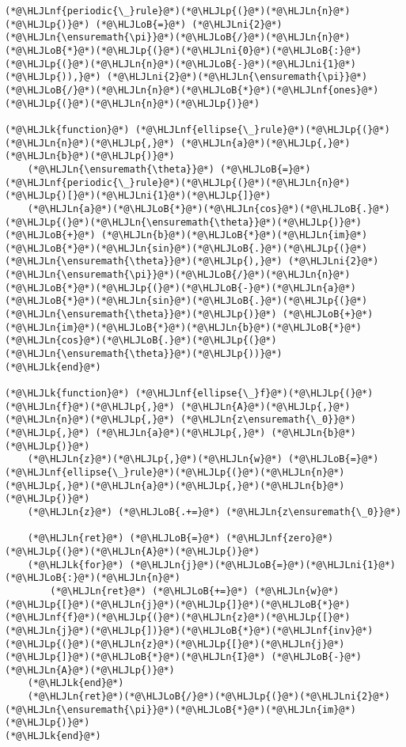 \documentclass[12pt,a4paper]{article}
\newcommand{\HLJLk}[1]{\textcolor[RGB]{148,91,176}{\textbf{#1}}}
\newcommand{\HLJLn}[1]{#1}
\newcommand{\HLJLnf}[1]{\textcolor[RGB]{66,102,213}{#1}}
\newcommand{\HLJLni}[1]{\textcolor[RGB]{59,151,46}{#1}}
\newcommand{\HLJLoB}[1]{\textcolor[RGB]{102,102,102}{\textbf{#1}}}
\newcommand{\HLJLp}[1]{#1}
\begin{document}
\begin{lstlisting}
(*@\HLJLnf{periodic{\_}rule}@*)(*@\HLJLp{(}@*)(*@\HLJLn{n}@*)(*@\HLJLp{)}@*) (*@\HLJLoB{=}@*) (*@\HLJLni{2}@*)(*@\HLJLn{\ensuremath{\pi}}@*)(*@\HLJLoB{/}@*)(*@\HLJLn{n}@*)(*@\HLJLoB{*}@*)(*@\HLJLp{(}@*)(*@\HLJLni{0}@*)(*@\HLJLoB{:}@*)(*@\HLJLp{(}@*)(*@\HLJLn{n}@*)(*@\HLJLoB{-}@*)(*@\HLJLni{1}@*)(*@\HLJLp{)),}@*) (*@\HLJLni{2}@*)(*@\HLJLn{\ensuremath{\pi}}@*)(*@\HLJLoB{/}@*)(*@\HLJLn{n}@*)(*@\HLJLoB{*}@*)(*@\HLJLnf{ones}@*)(*@\HLJLp{(}@*)(*@\HLJLn{n}@*)(*@\HLJLp{)}@*)

(*@\HLJLk{function}@*) (*@\HLJLnf{ellipse{\_}rule}@*)(*@\HLJLp{(}@*)(*@\HLJLn{n}@*)(*@\HLJLp{,}@*) (*@\HLJLn{a}@*)(*@\HLJLp{,}@*) (*@\HLJLn{b}@*)(*@\HLJLp{)}@*)
    (*@\HLJLn{\ensuremath{\theta}}@*) (*@\HLJLoB{=}@*) (*@\HLJLnf{periodic{\_}rule}@*)(*@\HLJLp{(}@*)(*@\HLJLn{n}@*)(*@\HLJLp{)[}@*)(*@\HLJLni{1}@*)(*@\HLJLp{]}@*)
    (*@\HLJLn{a}@*)(*@\HLJLoB{*}@*)(*@\HLJLn{cos}@*)(*@\HLJLoB{.}@*)(*@\HLJLp{(}@*)(*@\HLJLn{\ensuremath{\theta}}@*)(*@\HLJLp{)}@*) (*@\HLJLoB{+}@*) (*@\HLJLn{b}@*)(*@\HLJLoB{*}@*)(*@\HLJLn{im}@*)(*@\HLJLoB{*}@*)(*@\HLJLn{sin}@*)(*@\HLJLoB{.}@*)(*@\HLJLp{(}@*)(*@\HLJLn{\ensuremath{\theta}}@*)(*@\HLJLp{),}@*) (*@\HLJLni{2}@*)(*@\HLJLn{\ensuremath{\pi}}@*)(*@\HLJLoB{/}@*)(*@\HLJLn{n}@*)(*@\HLJLoB{*}@*)(*@\HLJLp{(}@*)(*@\HLJLoB{-}@*)(*@\HLJLn{a}@*)(*@\HLJLoB{*}@*)(*@\HLJLn{sin}@*)(*@\HLJLoB{.}@*)(*@\HLJLp{(}@*)(*@\HLJLn{\ensuremath{\theta}}@*)(*@\HLJLp{)}@*) (*@\HLJLoB{+}@*) (*@\HLJLn{im}@*)(*@\HLJLoB{*}@*)(*@\HLJLn{b}@*)(*@\HLJLoB{*}@*)(*@\HLJLn{cos}@*)(*@\HLJLoB{.}@*)(*@\HLJLp{(}@*)(*@\HLJLn{\ensuremath{\theta}}@*)(*@\HLJLp{))}@*)
(*@\HLJLk{end}@*)

(*@\HLJLk{function}@*) (*@\HLJLnf{ellipse{\_}f}@*)(*@\HLJLp{(}@*)(*@\HLJLn{f}@*)(*@\HLJLp{,}@*) (*@\HLJLn{A}@*)(*@\HLJLp{,}@*) (*@\HLJLn{n}@*)(*@\HLJLp{,}@*) (*@\HLJLn{z\ensuremath{\_0}}@*)(*@\HLJLp{,}@*) (*@\HLJLn{a}@*)(*@\HLJLp{,}@*) (*@\HLJLn{b}@*)(*@\HLJLp{)}@*)
    (*@\HLJLn{z}@*)(*@\HLJLp{,}@*)(*@\HLJLn{w}@*) (*@\HLJLoB{=}@*) (*@\HLJLnf{ellipse{\_}rule}@*)(*@\HLJLp{(}@*)(*@\HLJLn{n}@*)(*@\HLJLp{,}@*)(*@\HLJLn{a}@*)(*@\HLJLp{,}@*)(*@\HLJLn{b}@*)(*@\HLJLp{)}@*)
    (*@\HLJLn{z}@*) (*@\HLJLoB{.+=}@*) (*@\HLJLn{z\ensuremath{\_0}}@*)

    (*@\HLJLn{ret}@*) (*@\HLJLoB{=}@*) (*@\HLJLnf{zero}@*)(*@\HLJLp{(}@*)(*@\HLJLn{A}@*)(*@\HLJLp{)}@*)
    (*@\HLJLk{for}@*) (*@\HLJLn{j}@*)(*@\HLJLoB{=}@*)(*@\HLJLni{1}@*)(*@\HLJLoB{:}@*)(*@\HLJLn{n}@*)
        (*@\HLJLn{ret}@*) (*@\HLJLoB{+=}@*) (*@\HLJLn{w}@*)(*@\HLJLp{[}@*)(*@\HLJLn{j}@*)(*@\HLJLp{]}@*)(*@\HLJLoB{*}@*)(*@\HLJLnf{f}@*)(*@\HLJLp{(}@*)(*@\HLJLn{z}@*)(*@\HLJLp{[}@*)(*@\HLJLn{j}@*)(*@\HLJLp{])}@*)(*@\HLJLoB{*}@*)(*@\HLJLnf{inv}@*)(*@\HLJLp{(}@*)(*@\HLJLn{z}@*)(*@\HLJLp{[}@*)(*@\HLJLn{j}@*)(*@\HLJLp{]}@*)(*@\HLJLoB{*}@*)(*@\HLJLn{I}@*) (*@\HLJLoB{-}@*) (*@\HLJLn{A}@*)(*@\HLJLp{)}@*)
    (*@\HLJLk{end}@*)
    (*@\HLJLn{ret}@*)(*@\HLJLoB{/}@*)(*@\HLJLp{(}@*)(*@\HLJLni{2}@*)(*@\HLJLn{\ensuremath{\pi}}@*)(*@\HLJLoB{*}@*)(*@\HLJLn{im}@*)(*@\HLJLp{)}@*)
(*@\HLJLk{end}@*)


\end{lstlisting}
\end{document}
